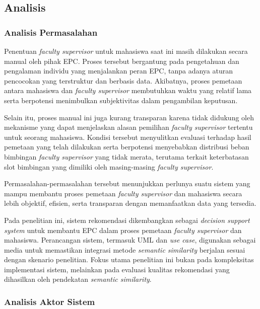 \subsection{Analisis}\label{analisis}

\subsubsection{Analisis Permasalahan}\label{analisis-permasalahan}

Penentuan \textit{faculty supervisor} untuk mahasiswa saat ini masih dilakukan secara manual oleh pihak EPC. Proses tersebut bergantung pada pengetahuan dan pengalaman individu yang menjalankan peran EPC, tanpa adanya aturan pencocokan yang terstruktur dan berbasis data. Akibatnya, proses pemetaan antara mahasiswa dan \textit{faculty supervisor} membutuhkan waktu yang relatif lama serta berpotensi menimbulkan subjektivitas dalam pengambilan keputusan.

Selain itu, proses manual ini juga kurang transparan karena tidak didukung oleh mekanisme yang dapat menjelaskan alasan pemilihan \textit{faculty supervisor} tertentu untuk seorang mahasiswa. Kondisi tersebut menyulitkan evaluasi terhadap hasil pemetaan yang telah dilakukan serta berpotensi menyebabkan distribusi beban bimbingan \textit{faculty supervisor} yang tidak merata, terutama terkait keterbatasan slot bimbingan yang dimiliki oleh masing-masing \textit{faculty supervisor}.

Permasalahan-permasalahan tersebut menunjukkan perlunya suatu sistem yang mampu membantu proses pemetaan \textit{faculty supervisor} dan mahasiswa secara lebih objektif, efisien, serta transparan dengan memanfaatkan data yang tersedia.

Pada penelitian ini, sistem rekomendasi dikembangkan sebagai \textit{decision support system} untuk membantu EPC dalam proses pemetaan \textit{faculty supervisor} dan mahasiswa. Perancangan sistem, termasuk UML dan \textit{use case}, digunakan sebagai media untuk memastikan integrasi metode \textit{semantic similarity} berjalan sesuai dengan skenario penelitian. Fokus utama penelitian ini bukan pada kompleksitas implementasi sistem, melainkan pada evaluasi kualitas rekomendasi yang dihasilkan oleh pendekatan \textit{semantic similarity}.

\subsubsection{Analisis Aktor Sistem}\label{analisis-aktor-sistem}

